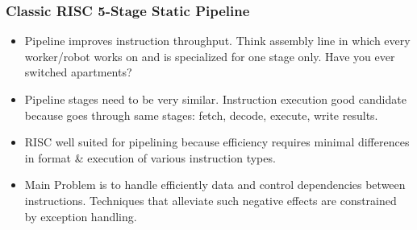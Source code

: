 \documentclass{beamer}
\newcommand{\emp}[1]{\textcolor{DikuRed}{ #1}}
\begin{document}
\begin{frame}[fragile,t]
\frametitle{Classic RISC 5-Stage Static Pipeline}

\begin{itemize}
\item Pipeline improves instruction throughput. Think assembly line in 
        which every worker/robot works on and is specialized for one 
        stage only. Have you ever switched apartments?\bigskip

\item Pipeline stages need to be very similar. Instruction execution good
        candidate because goes through same stages: fetch, decode, execute, 
        write results.\bigskip

\item RISC well suited for pipelining because efficiency requires minimal
        differences in format \& execution of various instruction types.\bigskip

\item \emp{Main Problem} is to handle efficiently data and control dependencies
        between instructions.  Techniques that alleviate such negative effects
        are constrained by exception handling.
\end{itemize}

\end{frame}
\end{document}
